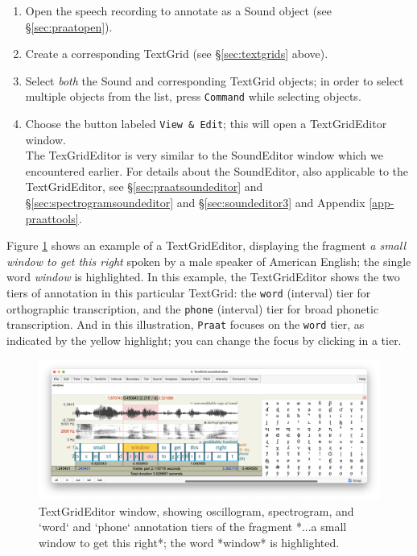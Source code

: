\documentclass[
]{book}
\begin{document}
\begin{enumerate}
\def\labelenumi{(\arabic{enumi})}
\item
  Open the speech recording to annotate as a Sound object (see §\ref{sec:praatopen}).
\item
  Create a corresponding TextGrid (see §\ref{sec:textgrids} above).
\item
  Select \emph{both} the Sound and corresponding TextGrid objects; in order to select multiple objects from the list, press \texttt{Command} while selecting objects.
\item
  Choose the button labeled \texttt{View\ \&\ Edit}; this will open a TextGridEditor window.\\
  The TexGridEditor is very similar to the SoundEditor window which we encountered earlier. For details about the SoundEditor, also applicable to the TextGridEditor, see §\ref{sec:praatsoundeditor} and
  §\ref{sec:spectrogramsoundeditor} and
  §\ref{sec:soundeditor3} and
  Appendix \ref{app-praattools}.
\end{enumerate}

Figure \ref{fig:window-textgrideditor} shows an example of a TextGridEditor, displaying the fragment \emph{a small window to get this right} spoken by a male speaker of American English; the single word \emph{window} is highlighted.
In this example, the TextGridEditor shows the two tiers of annotation in this particular TextGrid: the \texttt{word} (interval) tier for orthographic transcription, and the \texttt{phone} (interval) tier for broad phonetic transcription. And in this illustration, \texttt{Praat} focuses on the \texttt{word} tier, as indicated by the yellow highlight; you can change the focus by clicking in a tier.

\begin{figure}

{\centering \includegraphics{figures/asmallwindowtogetthisright_TextGridEditor20250130} 

}

\caption{TextGridEditor window, showing oscillogram, spectrogram, and `word` and `phone` annotation tiers of the fragment *...a small window to get this right*; the word *window* is highlighted.}\label{fig:window-textgrideditor}
\end{figure}
\end{document}
